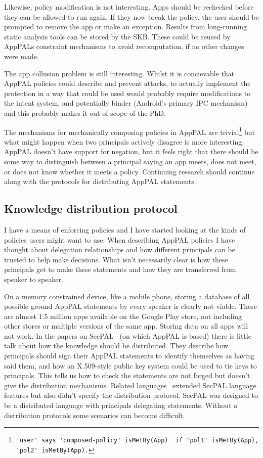 \documentclass[a4paper]{scrartcl}
\begin{document}
Likewise, policy modification is not interesting.
Apps should be rechecked before they can be allowed to run again.
If they now break the policy, the user should be prompted to remove the app or make an exception.
Results from long-running static analysis tools can be stored by the \ac{SKB}.
These could be reused by AppPALs constraint mechanisms to avoid recomputation, if no other changes were made.

The app collusion problem is still interesting.
Whilst it is concievable that AppPAL policies could describe and prevent attacks, to actually implement the protection in a way that could be used would probably require modifications to the intent system, and potentially binder (Android's primary IPC mechanism) and this probably makes it out of scope of the PhD.

The mechanisms for mechanically composing policies in AppPAL are trivial\footnote{\lstinline{'user' says 'composed-policy' isMetBy(App)  if 'pol1' isMetBy(App), 'pol2' isMetBy(App).}} but what might happen when two principals actively disagree is more interesting.
AppPAL doesn't have support for negation, but it feels right that there should be some way to distinguish between a principal saying an app meets, does not meet, or does not know whether it meets a policy.
Continuing research should continue along with the protocols for distributing AppPAL statements.

\subsection{Knowledge distribution protocol}
\label{ssec:kdp}

I have a means of enforcing policies and I have started looking at the kinds of policies users might want to use.
When describing AppPAL policies I have thought about delegation relationships and how different principals can be trusted to help make decisions.
What isn't necessarily clear is how these principals get to make these statements and how they are transferred from speaker to speaker.

On a memory constrained device, like a mobile phone, storing a database of all possible ground AppPAL statements by every speaker is clearly not viable.
There are almost 1.5 million apps available on the Google Play store, not including other stores or multiple versions of the same app.
Storing data on all apps will not work.
In the papers on SecPAL~\citep{Becker:2006vh,Becker:2009vt} (on which AppPAL is based) there is little talk about how the knowledge should be distributed.
They describe how principals should sign their AppPAL statements to identify themselves as having said them, and how an X.509-style public key system could be used to tie keys to principals.  This tells us how to check the statements are not forged but doesn't give the distribution mechanisms.
Related languages~\citep{Becker:2009ula,Aziz:2011vt,Gurevich:2008fz,Gurevich:Qo5E3M3} extended SecPAL language features but also didn't specify the distribution protocol.
SecPAL was designed to be a distributed language with principals delegating statements.
Without a distribution protocols some scenarios can become difficult.
\end{document}
